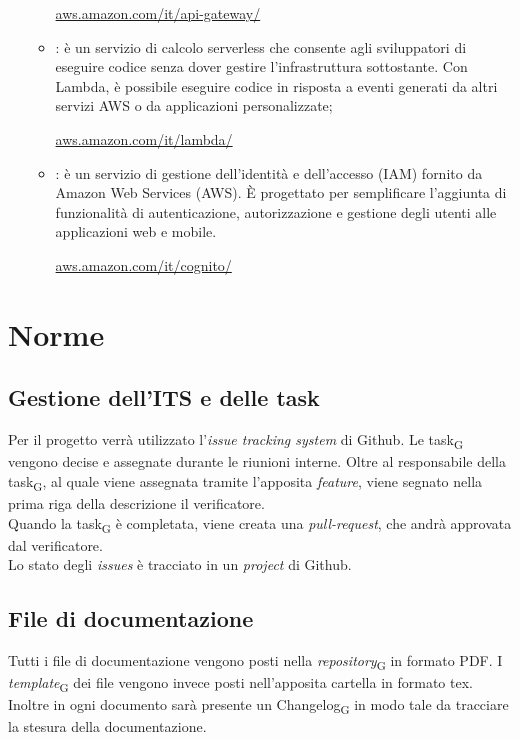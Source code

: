\documentclass{article}
\newcommand{\custombold}{\contour{black}}
\begin{document}
\begin{itemize}
\begin{itemize}
        \begin{center}
            \href{https://aws.amazon.com/it/api-gateway/}{aws.amazon.com/it/api-gateway/}
        \end{center}
        \item \custombold{AWS Lambda}: è un servizio di calcolo serverless che consente agli sviluppatori di eseguire codice senza dover gestire l'infrastruttura sottostante. Con Lambda, è possibile eseguire codice in risposta a eventi generati da altri servizi AWS o da applicazioni personalizzate;\\
        \begin{center}
            \href{https://aws.amazon.com/it/lambda/}{aws.amazon.com/it/lambda/}
        \end{center}
        \item \custombold{AWS Cognito}: è un servizio di gestione dell'identità e dell'accesso (IAM) fornito da Amazon Web Services (AWS). È progettato per semplificare l'aggiunta di funzionalità di autenticazione, autorizzazione e gestione degli utenti alle applicazioni web e mobile.\\
        \begin{center}
            \href{https://aws.amazon.com/it/cognito/}{aws.amazon.com/it/cognito/}
        \end{center}
    \end{itemize}
\end{itemize}

\section{Norme}
\subsection{Gestione dell'ITS e delle task}
Per il progetto verrà utilizzato l'\textit{issue tracking system} di Github. Le task\textsubscript{G} vengono decise e assegnate durante le riunioni interne. Oltre al responsabile della task\textsubscript{G}, al quale viene assegnata tramite l'apposita \textit{feature}, viene segnato nella prima riga della descrizione il verificatore.\\
Quando la task\textsubscript{G} è completata, viene creata una \textit{pull-request}, che andrà approvata dal verificatore.\\
Lo stato degli \textit{issues} è tracciato in un \textit{project} di Github.

\subsection{File di documentazione}
Tutti i file di documentazione vengono posti nella \textit{repository}\textsubscript{G} in formato PDF. I \textit{template}\textsubscript{G} dei file vengono invece posti nell'apposita cartella in formato tex. Inoltre in ogni documento sarà presente un Changelog\textsubscript{G} in modo tale da tracciare la stesura della documentazione.
\end{document}
